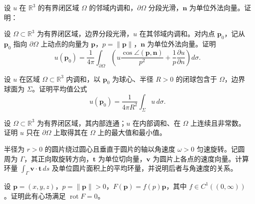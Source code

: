 \noindent\begin{minipage}{\textwidth}
设 $u$ 在 $\mathbb R^3$ 的有界闭区域 $\Omega$ 的邻域内调和，$\partial\Omega$ 分段光滑，$\mathbf n$ 为单位外法向量。证明：
\end{minipage}\par\vfill
\newpage
\noindent\begin{minipage}{\textwidth}
设 $\Omega\subset\mathbb R^3$ 为有界闭区域，边界分段光滑，$u$ 在其邻域内调和。对内点 $\mathbf p_0$，记从 $\mathbf p_0$ 指向 $\partial\Omega$ 上动点的向量为 $\mathbf p$，$p=\|\mathbf p\|$，$\mathbf n$ 为单位外法向量。证明\[u(\mathbf p_0)=\frac1{4\pi}\int_{\partial\Omega}\left(u\frac{\cos\angle(\mathbf p,\mathbf n)}{p^2}+\frac1p\frac{\partial u}{\partial n}\right)d\sigma.\]
\end{minipage}\par\vfill
\noindent\begin{minipage}{\textwidth}
设 $u$ 在区域 $\Omega\subset\mathbb R^3$ 内调和，以 $\mathbf p_0$ 为球心、半径 $R>0$ 的闭球包含于 $\Omega$，边界球面为 $\Sigma$。证明平均值公式\[u(\mathbf p_0)=\frac1{4\pi R^2}\int_\Sigma u\,d\sigma.\]
\end{minipage}\par\vfill
\noindent\begin{minipage}{\textwidth}
设 $\Omega\subset\mathbb R^3$ 为有界闭区域，其内部连通；$u$ 在内部调和、在 $\Omega$ 上连续且非常数。证明 $u$ 只在 $\partial\Omega$ 上取得其在 $\Omega$ 上的最大值和最小值。
\end{minipage}\par\vfill
\newpage
\noindent\begin{minipage}{\textwidth}
半径为 $r>0$ 的圆片绕过圆心且垂直于圆片的轴以角速度 $\omega>0$ 匀速旋转。记圆周为 $\Gamma$，其正向取旋转方向，$\mathbf t$ 为单位切向量，$\mathbf v$ 为圆片上各点的速度向量。计算环量 $\int_\Gamma\mathbf v\cdot\mathbf t\,ds$ 及单位圆片面积上的平均环量，并说明后者与角速度的关系。
\end{minipage}\par\vfill
\noindent\begin{minipage}{\textwidth}
设 $\mathbf p=(x,y,z)$，$p=\|\mathbf p\|>0$，$F(\mathbf p)=f(p)\mathbf p$，其中 $f\in C^1((0,\infty))$。证明此有心场满足 $\operatorname{rot}F=0$。
\end{minipage}\par\vfill
